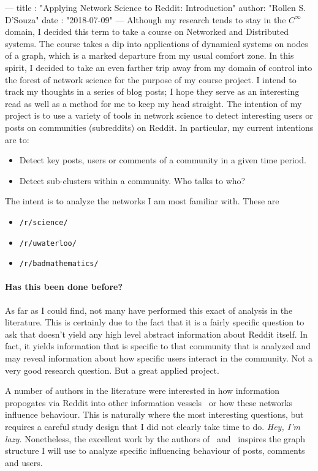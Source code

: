 ---
title :   "Applying Network Science to Reddit: Introduction"
author:   "Rollen S. D'Souza"
date  :   "2018-07-09"
---
Although my research tends to stay in the \(C^\infty\) domain, I decided this term to take a course on Networked and Distributed systems.
The course takes a dip into applications of dynamical systems on nodes of a graph, which is a marked departure from my usual comfort zone.
In this spirit, I decided to take an even farther trip away from my domain of control into the forest of network science for the purpose of my course project.
I intend to track my thoughts in a series of blog posts;
I hope they serve as an interesting read as well as a method for me to keep my head straight.
The intention of my project is to use a variety of tools in network science to detect interesting users or posts on communities (subreddits) on Reddit.
In particular, my current intentions are to:
%
\begin{itemize}
 \item{Detect key posts, users or comments of a community in a given time period.}
 \item{Detect sub-clusters within a community. Who talks to who?}
\end{itemize}
%
The intent is to analyze the networks I am most familiar with.
These are
%
\begin{itemize}
  \item{\texttt{/r/science/}}
  \item{\texttt{/r/uwaterloo/}}
  \item{\texttt{/r/badmathematics/}}
\end{itemize}
%

\paragraph{Has this been done before?}
As far as I could find, not many have performed this exact of analysis in the literature.
This is certainly due to the fact that it is a fairly specific question to ask that doesn't yield any high level abstract information about Reddit itself.
In fact, it yields information that is specific to that community that is analyzed and may reveal information about how specific users interact in the community.
Not a very good research question.
But a great applied project.

A number of authors in the literature were interested in how information propogates via Reddit into other information vessels~\cite{c1} or how these networks influence behaviour.
This is naturally where the most interesting questions, but requires a careful study design that I did not clearly take time to do.
\emph{Hey, I'm lazy.}
Nonetheless, the excellent work by the authors of~\cite{c2} and~\cite{c3} inspires the graph structure I will use to analyze specific influencing behaviour of posts, comments and users.

